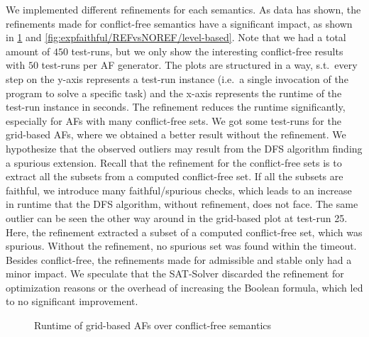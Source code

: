 We implemented different refinements for each semantics. As data has shown, the refinements made for conflict-free semantics have a significant impact, as shown in \cref{fig:expfaithful/REFvsNOREF/grid-based} and \cref{fig:expfaithful/REFvsNOREF/level-based}. Note that we had a total amount of $450$ test-runs, but we only show the interesting conflict-free results with $50$ test-runs per AF generator. The plots are structured in a way, s.t.\ every step on the y-axis represents a test-run instance (i.e.\ a single invocation of the program to solve a specific task) and the x-axis represents the runtime of the test-run instance in seconds.
The refinement reduces the runtime significantly, especially for AFs with many conflict-free sets. We got some test-runs for the grid-based AFs, where we obtained a better result without the refinement. We hypothesize that the observed outliers may result from the DFS algorithm finding a spurious extension. Recall that the refinement for the conflict-free sets is to extract all the subsets from a computed conflict-free set. If all the subsets are faithful, we introduce many faithful/spurious checks, which leads to an increase in runtime that the DFS algorithm, without refinement, does not face. The same outlier can be seen the other way around in the grid-based plot at test-run 25. Here, the refinement extracted a subset of a computed conflict-free set, which was spurious. Without the refinement, no spurious set was found within the timeout. Besides conflict-free, the refinements made for admissible and stable only had a minor impact. We speculate that the SAT-Solver discarded the refinement for optimization reasons or the overhead of increasing the Boolean formula, which led to no significant improvement.


\begin{figure}[H]
    \centering
    \caption{Runtime of grid-based AFs over conflict-free semantics}
    \label{fig:expfaithful/REFvsNOREF/grid-based}
\end{figure}

